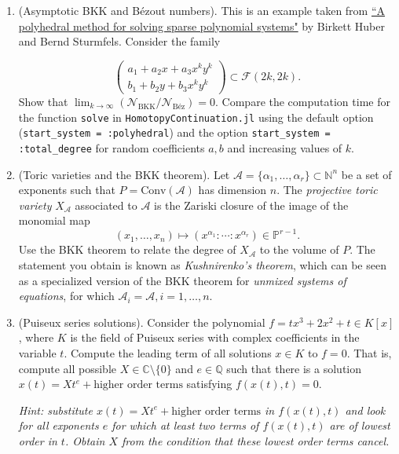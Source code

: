 \documentclass[11pt,reqno]{amsart}
\theoremstyle{definition}
\theoremstyle{remark}
\numberwithin{equation}{section}
\begin{document}
\begin{enumerate}
\item (Asymptotic BKK and B\'ezout numbers).
This is an example taken from \href{https://www.jstor.org/stable/2153370?seq=1#metadata_info_tab_contents}{ ``A polyhedral method for solving sparse polynomial systems"} by Birkett Huber and Bernd Sturmfels. Consider the family

$$\begin{pmatrix}
a_1 +  a_2 x + a_3 x^ky^k \\
b_1 + b_2 y + b_3 x^ky^k
\end{pmatrix} \subset \mathcal{F}(2k,2k).$$
Show that $\lim_{k \rightarrow \infty} ( \mathcal{N}_{\text{BKK}} / \mathcal{N}_{\text{Béz}} ) = 0$. Compare the computation time for the function \texttt{solve} in \texttt{HomotopyContinuation.jl} using the default option (\texttt{start\_system = :polyhedral}) and the option \texttt{start\_system = :total\_degree} for random coefficients $a, b$ and increasing values of $k$.

 \item (Toric varieties and the BKK theorem).
Let $\mathcal{A} = \{ \alpha_1, \ldots, \alpha_r \} \subset \mathbb{N}^n$ be a set of exponents such that $P = \text{Conv}(\mathcal{A})$ has dimension $n$. The \emph{projective toric variety} $X_\mathcal{A}$ associated to $\mathcal{A}$ is the Zariski closure of the image of the monomial map
$$ (x_1, \ldots, x_n) \mapsto (x^{\alpha_1} : \cdots : x^{\alpha_r}) \in \mathbb{P}^{r-1}.$$
Use the BKK theorem to relate the degree of $X_\mathcal{A}$ to the volume of $P$. The statement you obtain is known as \emph{Kushnirenko's theorem}, which can be seen as a specialized version of the BKK theorem for \emph{unmixed systems of equations}, for which $\mathcal{A}_i = \mathcal{A}, i = 1, \ldots, n$.

\item (Puiseux series solutions).
Consider the polynomial $f = tx^3 + 2x^2 + t \in K[x]$, where $K$ is the field of Puiseux series with complex coefficients in the variable $t$. Compute the leading term of all solutions $x \in K$ to $f = 0$. That is, compute all possible $X \in \mathbb{C} \setminus \{0\}$ and $e \in \mathbb{Q}$ such that there is a solution $x(t) = X t^e + \text{higher order terms}$ satisfying $f(x(t),t) = 0$.

\textit{Hint: substitute $x(t) = X t^e + \text{higher order terms}$ in $f(x(t),t)$ and look for all exponents $e$ for which at least two terms of $f(x(t),t)$ are of lowest order in $t$. Obtain $X$ from the condition that these lowest order terms cancel. }


\end{enumerate}
\end{document}
